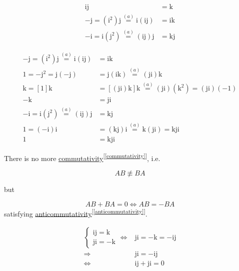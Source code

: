 \documentclass[
]{book}
\theoremstyle{definition}
\theoremstyle{definition}
\theoremstyle{definition}
\theoremstyle{definition}
\theoremstyle{remark}
\begin{document}
\[
\begin{aligned}
\mathrm{i}\mathrm{j} & =\mathrm{k}\\
-\mathrm{j}=\left(\mathrm{i}^{2}\right)\mathrm{j}\overset{\left(a\right)}{=}\mathrm{i}\left(\mathrm{i}\mathrm{j}\right) & =\mathrm{i}\mathrm{k}\\
-\mathrm{i}=\mathrm{i}\left(\mathrm{j}^{2}\right)\overset{\left(a\right)}{=}\left(\mathrm{i}\mathrm{j}\right)\mathrm{j} & =\mathrm{k}\mathrm{j}
\end{aligned}
\]

\[
\begin{aligned}
-\mathrm{j}=\left(\mathrm{i}^{2}\right)\mathrm{j}\overset{\left(a\right)}{=}\mathrm{i}\left(\mathrm{i}\mathrm{j}\right) & =\mathrm{i}\mathrm{k}\\
1=-\mathrm{j}^{2}=\mathrm{j}\left(-\mathrm{j}\right) & =\mathrm{j}\left(\mathrm{i}\mathrm{k}\right)\overset{\left(a\right)}{=}\left(\mathrm{j}\mathrm{i}\right)\mathrm{k}\\
\mathrm{k}=\left[1\right]\mathrm{k} & =\left[\left(\mathrm{j}\mathrm{i}\right)\mathrm{k}\right]\mathrm{k}\overset{\left(a\right)}{=}\left(\mathrm{j}\mathrm{i}\right)\left(\mathrm{k}^{2}\right)=\left(\mathrm{j}\mathrm{i}\right)\left(-1\right)\\
-\mathrm{k} & =\mathrm{j}\mathrm{i}\\
-\mathrm{i}=\mathrm{i}\left(\mathrm{j}^{2}\right)\overset{\left(a\right)}{=}\left(\mathrm{i}\mathrm{j}\right)\mathrm{j} & =\mathrm{k}\mathrm{j}\\
1=\left(-\mathrm{i}\right)\mathrm{i} & =\left(\mathrm{k}\mathrm{j}\right)\mathrm{i}\overset{\left(a\right)}{=}\mathrm{k}\left(\mathrm{j}\mathrm{i}\right)=\mathrm{k}\mathrm{j}\mathrm{i}\\
1 & =\mathrm{k}\mathrm{j}\mathrm{i}
\end{aligned}
\]

There is no more \hyperref[commutativity]{commutativity}\textsuperscript{{[}\ref{commutativity}{]}}, i.e.

\[
AB\not\equiv BA
\]

but

\[
AB+BA=0\Leftrightarrow AB=-BA
\]
satisfying \hyperref[anticommutativity]{anticommutativity}\textsuperscript{{[}\ref{anticommutativity}{]}}.

\[
\begin{aligned}
\begin{cases}
\mathrm{i}\mathrm{j}=\mathrm{k}\\
\mathrm{j}\mathrm{i}=-\mathrm{k}
\end{cases}\Leftrightarrow & \mathrm{j}\mathrm{i}=-\mathrm{k}=-\mathrm{i}\mathrm{j}\\
\Rightarrow & \mathrm{j}\mathrm{i}=-\mathrm{i}\mathrm{j}\\
\Leftrightarrow & \mathrm{i}\mathrm{j}+\mathrm{j}\mathrm{i}=0
\end{aligned}
\]
\end{document}
